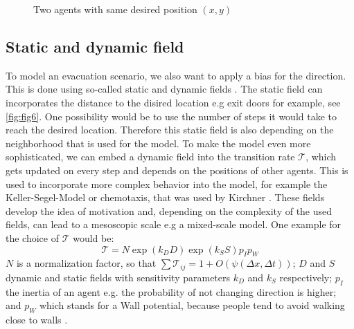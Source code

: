 \begin{figure}
   \centering 
   \caption{Two agents with same desired position $(x,y)$}
   \label{fig:fig5}
  
\end{figure}


\subsection{Static and dynamic field}
To model an evacuation scenario, we also want to apply a bias for the direction. This is done using so-called static and dynamic fields \autocite{Michi}. 
The static field can incorporates the distance to the disired location e.g exit doors for example, see \autoref{fig:fig6}.
One possibility would be to use the number of steps it would take to reach the desired location. 
Therefore this static field is also depending on the neighborhood that is used for the model. 
To make the model even more sophisticated, 
we can embed a dynamic field into the transition rate $ \mathcal{T}$, 
which gets updated on every step and depends on the positions of other agents. 
This is used to incorporate more complex behavior into the model, for example the Keller-Segel-Model \autocite{keller1970initiation} or chemotaxis, that was used by Kirchner \autocite{kirchner2002simulation}.
These fields develop the idea of motivation and, depending on the complexity of the used fields, can lead to a mesoscopic scale e.g a mixed-scale model.
One example for the choice of $\mathcal{T}$ would be: 
\begin{equation}
   \mathcal{T} = N \exp(k_DD)\exp(k_SS)p_Ip_W 
\end{equation}
$N$ is a normalization factor, so that $\sum \mathcal{T}_{ij} = 1 + O (\psi(\Delta x,\Delta t))$;
$D$ and $S$ dynamic and static fields with sensitivity parameters $k_D$ and $k_S$ respectively; 
$p_I$ the inertia of an agent e.g. the probability of not changing direction is higher;
and $p_W$ which stands for a Wall potential, because people tend to avoid walking close to walls \cite{nishinari2004extended}.  

